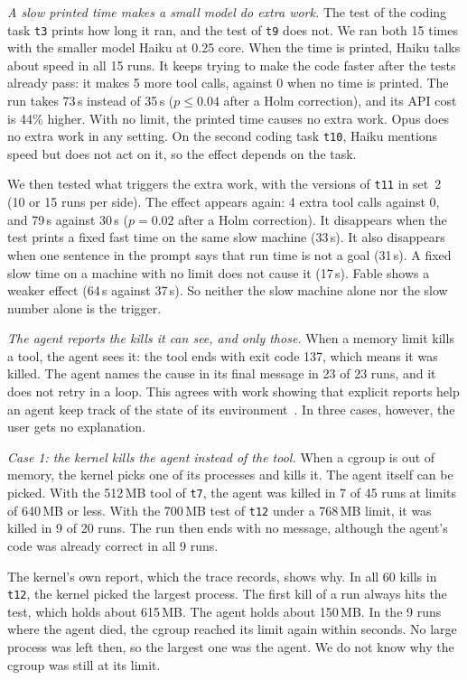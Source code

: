 \documentclass[sigconf,review,anonymous]{acmart}
\begin{document}
\emph{A slow printed time makes a small model do extra work.} The test
of the coding task \texttt{t3} prints how long it ran, and the test of
\texttt{t9} does not. We ran both 15 times with the smaller model Haiku
at 0.25 core. When the time is printed, Haiku talks about speed in all
15 runs. It keeps trying to make the code faster after the tests already
pass: it makes 5 more tool calls, against 0 when no time is printed. The
run takes 73\,s instead of 35\,s ($p \leq 0.04$ after a Holm
correction), and its API cost is 44\% higher. With no limit, the printed
time causes no extra work. Opus does no extra work in any setting. On
the second coding task \texttt{t10}, Haiku mentions speed but does not
act on it, so the effect depends on the task.

We then tested what triggers the extra work, with the versions of
\texttt{t11} in set~2 (10 or 15 runs per side). The effect appears
again: 4 extra tool calls against 0, and 79\,s against 30\,s
($p = 0.02$ after a Holm correction). It disappears when the test prints
a fixed fast time on the same slow machine (33\,s). It also disappears
when one sentence in the prompt says that run time is not a goal
(31\,s). A fixed slow time on a machine with no limit does not cause it
(17\,s). Fable shows a weaker effect (64\,s against 37\,s). So neither
the slow machine alone nor the slow number alone is the trigger.

\emph{The agent reports the kills it can see, and only those.} When a
memory limit kills a tool, the agent sees it: the tool ends with exit
code 137, which means it was killed. The agent names the cause in its
final message in 23 of 23 runs, and it does not retry in a loop. This
agrees with work showing that explicit reports help an agent keep track
of the state of its environment~\cite{song2025}. In three cases,
however, the user gets no explanation.

\emph{Case 1: the kernel kills the agent instead of the tool.} When a
cgroup is out of memory, the kernel picks one of its processes and kills
it. The agent itself can be picked. With the 512\,MB tool of
\texttt{t7}, the agent was killed in 7 of 45 runs at limits of 640\,MB
or less. With the 700\,MB test of \texttt{t12} under a 768\,MB limit, it
was killed in 9 of 20 runs. The run then ends with no message, although
the agent's code was already correct in all 9 runs.

The kernel's own report, which the trace records, shows why. In all 60
kills in \texttt{t12}, the kernel picked the largest process. The first
kill of a run always hits the test, which holds about 615\,MB. The agent
holds about 150\,MB. In the 9 runs where the agent died, the cgroup
reached its limit again within seconds. No large process was left then,
so the largest one was the agent. We do not know why the cgroup was
still at its limit.
\end{document}
